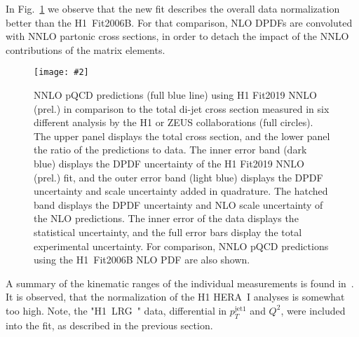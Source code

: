 \documentclass{PoS}
\makeatletter
\newcommand{\includegraphicss}[2][]{\texttt{[image: \#2]}}
\newcommand*{\rom}[1]{\expandafter\@slowromancap\romannumeral #1@}
\newcommand{\HERAII} {\protect\scalebox{0.8}{(HERA~\rom{2})}}
\newcommand{\HLRG}  {H1~LRG~\HERAII\xspace}
\makeatother
\begin{document}
In Fig.~\ref{figTotalXsecs} we observe that the new fit describes the overall data normalization better than the H1~Fit2006B. For that comparison, NLO DPDFs are convoluted with NNLO partonic cross sections, in order to detach the impact of the NNLO contributions of the matrix elements.
%
\begin{figure}[tbh]
\centering
\includegraphicss[trim={0cm 1.7cm 0 0.7cm},clip,width=.6\textwidth]{{{plots/H1prelim-19-013.fig3}}}
\caption{ NNLO pQCD predictions (full blue line) using H1 Fit2019 NNLO (prel.) in comparison to the total di-jet cross section measured in six different analysis by the H1 or ZEUS collaborations (full circles). The upper panel displays the total cross section, and the lower panel the ratio of the predictions to data. The inner error band (dark blue) displays the DPDF uncertainty of the H1 Fit2019 NNLO (prel.) fit, and the outer error band (light blue) displays the DPDF uncertainty and scale uncertainty added in quadrature. The hatched band displays the DPDF uncertainty and NLO scale uncertainty of the NLO predictions. The inner error of the data displays the statistical uncertainty, and the full error bars display the total experimental uncertainty. For comparison, NNLO pQCD predictions using the H1~Fit2006B NLO PDF are also shown.}
\label{figTotalXsecs}
\end{figure}
%
A summary of the kinematic ranges of the individual measurements is found in~\cite{Britzger:2018zvv}.
It is observed, that the normalization of the H1 HERA~I analyses is somewhat too high.
Note, the "\HLRG" data, differential in $p_T^{\mathrm{jet}1}$ and $Q^2$, were included into the fit, as described in the previous section.
\end{document}
